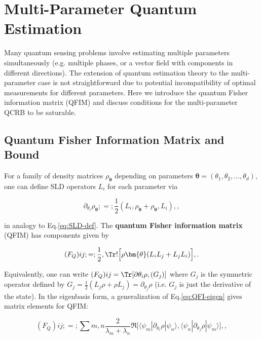 \section{Multi-Parameter Quantum Estimation}

\label{sec:multiparam}



Many quantum sensing problems involve estimating multiple parameters
simultaneously (e.g. multiple phases, or a vector field with
components in different directions). The extension of quantum
estimation theory to the multi-parameter case is not straightforward
due to potential incompatibility of optimal measurements for different
parameters. Here we introduce the quantum Fisher information matrix
(QFIM) and discuss conditions for the multi-parameter QCRB to be
saturable.



\subsection{Quantum Fisher Information Matrix and Bound}



For a family of density matrices $\rho_{\bm{\theta}}$ depending on
parameters $\bm{\theta} = (\theta_1,\theta_2,\ldots,\theta_d)$, one
can define SLD operators $L_i$ for each parameter via

\begin{equation}
\partial_{\theta_i} \rho_{\bm{\theta}} ;=; \frac{1}{2}(L_i,\rho_{\bm{\theta}} + \rho_{\bm{\theta}},L_i) ,,
\end{equation}

in analogy to Eq.\eqref{eq:SLD-def}. The \textbf{quantum Fisher information matrix} (QFIM) has components given by

\begin{equation}
(F_Q){ij} ;=; \frac{1}{2}, \Tr!\Big[\rho{\bm{\theta}} (L_i L_j + L_j L_i)\Big] ,.
\label{eq:QFIM-def}
\end{equation}

Equivalently, one can write $(F_Q){ij} = \Tr[\partial{\theta_i}\rho, (G_j)]$ where $G_j$ is the symmetric operator defined by $G_j = \frac{1}{2}(L_j \rho + \rho L_j) = \partial_{\theta_j}\rho$ (i.e. $G_j$ is just the derivative of the state). In the eigenbasis form, a generalization of Eq.\eqref{eq:QFI-eigen} gives matrix elements for QFIM:

\begin{equation}
(F_Q){ij} ;=; \sum{m,n} \frac{2}{\lambda_m + \lambda_n} \Re\big[\langle \psi_m|\partial_{\theta_i}\rho|\psi_n\rangle, \langle \psi_n|\partial_{\theta_j}\rho|\psi_m\rangle\big] ,,
\end{equation}


